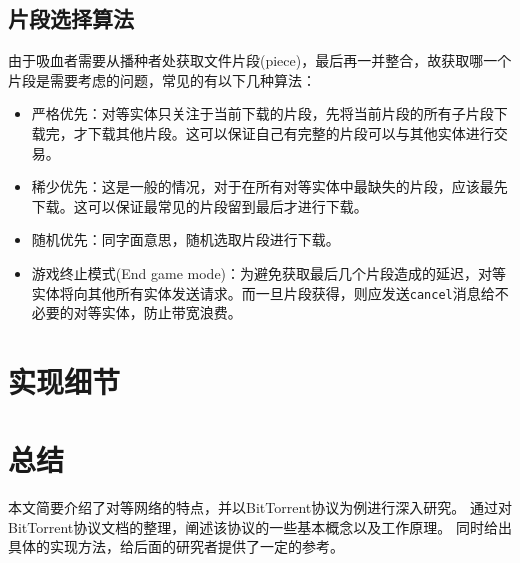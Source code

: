 \documentclass[thesis]{thesis}
\begin{document}
\subsection{片段选择算法}
\label{sub:sel_alg}
由于吸血者需要从播种者处获取文件片段(piece)，最后再一并整合，故获取哪一个片段是需要考虑的问题，常见的有以下几种算法：
\begin{itemize}
	\item 严格优先：对等实体只关注于当前下载的片段，先将当前片段的所有子片段下载完，才下载其他片段。这可以保证自己有完整的片段可以与其他实体进行交易。
	\item 稀少优先：这是一般的情况，对于在所有对等实体中最缺失的片段，应该最先下载。这可以保证最常见的片段留到最后才进行下载。
	\item 随机优先：同字面意思，随机选取片段进行下载。
	\item 游戏终止模式(End game mode)：为避免获取最后几个片段造成的延迟，对等实体将向其他所有实体发送请求。而一旦片段获得，则应发送\verb'cancel'消息给不必要的对等实体，防止带宽浪费。
\end{itemize}

\section{实现细节}


\section{总结}
本文简要介绍了对等网络的特点，并以BitTorrent协议为例进行深入研究。
通过对BitTorrent协议文档的整理，阐述该协议的一些基本概念以及工作原理。
同时给出具体的实现方法，给后面的研究者提供了一定的参考。



\end{document}
